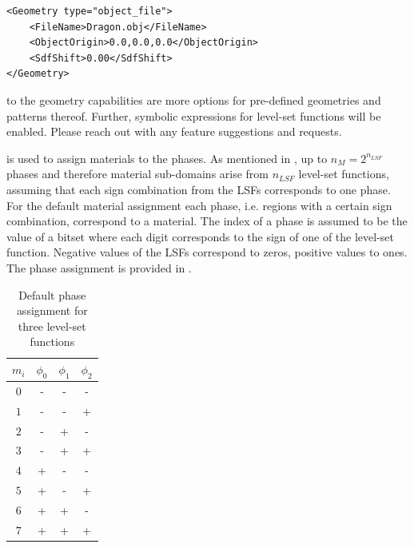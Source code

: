 \begin{minipage}{\linewidth}
\vspace{0.5cm}
\begin{lstlisting}[caption={Example parameters for an OBJ file as provided in one of the examples.},captionpos=b, label={lst:object}]
<Geometry type="object_file">
    <FileName>Dragon.obj</FileName>
    <ObjectOrigin>0.0,0.0,0.0</ObjectOrigin>
    <SdfShift>0.00</SdfShift>
</Geometry>
\end{lstlisting}
\end{minipage}

 to the geometry capabilities are more options for pre-defined geometries and patterns thereof. Further, symbolic expressions for level-set functions will be enabled. Please reach out with any feature suggestions and requests.

\newpage

 is used to assign materials to the phases. As mentioned in , up to $n_M = 2^{n_{LSF}}$ phases and therefore material sub-domains arise from $n_{LSF}$ level-set functions, assuming that each sign combination from the LSFs corresponds to one phase. For the default material assignment each phase, i.e. regions with a certain sign combination, correspond to a material. The index of a phase is assumed to be the value of a bitset where each digit corresponds to the sign of one of the level-set function. Negative values of the LSFs correspond to zeros, positive values to ones. The phase assignment is provided in .

\begin{table}[H]
\begin{center}
\begin{tabular}{ c|c c c } 
    $m_i$ & $\phi_0$ & $\phi_1$ & $\phi_2$ \\
    \hline
    $0$ & - & - & - \\ 
    $1$ & - & - & + \\ 
    $2$ & - & + & - \\ 
    $3$ & - & + & + \\ 
    $4$ & + & - & - \\ 
    $5$ & + & - & + \\ 
    $6$ & + & + & - \\ 
    $7$ & + & + & + \\ 
\end{tabular}
\caption{Default phase assignment for three level-set functions}
\label{tab:default_phase_assignment}
\end{center}
\end{table}

